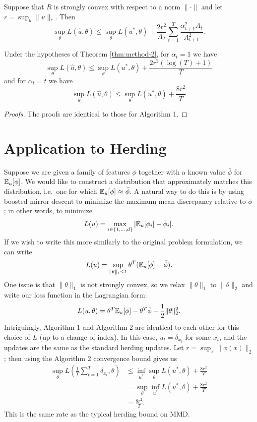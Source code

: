 \documentclass{article}
\begin{document}
\begin{theorem}
\label{thm:method-2}
Suppose that $R$ is strongly convex with respect to a norm $\|\cdot\|$ 
and let $r = \sup_{u} \|u\|_{*}$. Then 
\[ \sup_{\theta} L(\hat{u}, \theta) \leq \sup_{\theta} L(u^*, \theta) + \frac{2r^2}{A_T} \sum_{t=1}^T \frac{\alpha_{t+1}^2A_t}{A_{t+1}^2}. \]
\end{theorem}
\begin{corollary}
\label{cor:method-2}
Under the hypotheses of Theorem \ref{thm:method-2}, for $\alpha_t = 1$ we have
\[ \sup_{\theta} L(\hat{u}, \theta) \leq \sup_{\theta} L(u^*, \theta) + \frac{2r^2(\log(T) + 1)}{T} \]
and for $\alpha_t = t$ we have
\[ \sup_{\theta} L(\hat{u}, \theta) \leq \sup_{\theta} L(u^*, \theta) + \frac{8r^2}{T} \]
\end{corollary}
\begin{proof}[Proofs]
The proofs are identical to those for Algorithm 1.
\end{proof}

\section{Application to Herding}
\label{sec:herding}

Suppose we are given a family of features $\phi$ together 
with a known value $\bar{\phi}$ for $\mathbb{E}_{u}[\phi]$. We 
would like to construct a distribution that approximately 
matches this distribution, i.e.~one for which 
$\mathbb{E}_{\hat{u}}[\phi] \approx \bar{\phi}$. A natural way 
to do this is by using boosted mirror descent to minimize the 
maximum mean discrepancy relative to $\phi$; 
in other words, to minimize
\[ L(u) = \max_{i \in \{1,\dots,d\}} |\mathbb{E}_{u}[\phi_i]-\bar{\phi}_i|. \]
If we wish to write this more similarly to the original problem 
formulation, we can write
\[ L(u) = \sup_{\|\theta\|_1 \leq 1} \theta^T(\mathbb{E}_{u}[\phi]-\bar{\phi}). \]
One issue is that $\|\theta\|_1$ is not strongly convex, so we relax $\|\theta\|_1$ 
to $\|\theta\|_2$ and write our loss function in the Lagrangian form:
\[ L(u, \theta) = \theta^T\mathbb{E}_{u}[\phi] - \theta^T\bar{\phi} - \frac{1}{2}\|\theta\|_2^2. \]
Intriguingly, Algorithm 1 and Algorithm 2 are identical to each other for this choice of $L$ 
(up to a change of index). In this case, $u_t = \delta_{x_t}$ for some $x_t$, and 
the updates are the same as the standard herding updates. Let $r = \sup_{x} \|\phi(x)\|_2$; 
then using the Algorithm 2 convergence bound gives us
\begin{align*}
\sup_{\theta} L\left(\frac{1}{T} \sum_{t=1}^T \delta_{x_t}, \theta\right) &\leq \inf_{u^*} \sup_{\theta} L(u^*, \theta) + \frac{8r^2}{T} \\
 &= \sup_{\theta} \inf_{u^*} L(u^*, \theta) + \frac{8r^2}{T} \\
 &= \frac{8r^2}{T}.
\end{align*}
This is the same rate as the typical herding bound on MMD.
\end{document}
